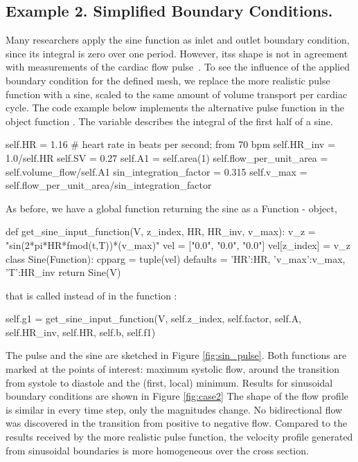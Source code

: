  

\subsection{Example 2. Simplified Boundary Conditions.} 

Many researchers apply the sine function as inlet and outlet boundary condition, since its integral is zero over one period. However, itss shape is not in agreement with measurements of the cardiac flow pulse~\cite{Loth2001}. To see the influence of the applied boundary condition for the defined mesh, we replace the more realistic pulse function with a sine, scaled to the same amount of volume transport per cardiac cycle. The code example below implements the alternative pulse function in the object function . The variable  describes the integral of the first half of a sine.
\begin{code}
self.HR = 1.16 # heart rate in beats per second; from 70 bpm
self.HR_inv = 1.0/self.HR
self.SV = 0.27 
self.A1 = self.area(1)
self.flow_per_unit_area = self.volume_flow/self.A1
sin_integration_factor = 0.315
self.v_max = self.flow_per_unit_area/sin_integration_factor	
\end{code}
As before, we have a global function returning the sine as a Function - object, 
\begin{code}
def get_sine_input_function(V, z_index, HR, HR_inv, v_max):
	v_z = "sin(2*pi*HR*fmod(t,T))*(v_max)"
	vel = ["0.0", "0.0", "0.0"]
	vel[z_index] = v_z
	class Sine(Function):
		cpparg = tuple(vel)
		defaults = {'HR':HR, 'v_max':v_max, 'T':HR_inv}		
	return Sine(V)
\end{code}
that is called instead of  in the function :
\begin{code}
self.g1 = get_sine_input_function(V, self.z_index, self.factor, self.A, self.HR_inv, self.HR, self.b, self.f1)
\end{code}



The pulse and the sine are sketched in Figure \ref{fig:sin_pulse}. Both functions are marked at the points of interest: maximum systolic flow, around the transition from systole to diastole and the (first, local) minimum. Results for sinusoidal boundary conditions are shown in Figure \ref{fig:case2} The shape of the flow profile is similar in every time step, only the magnitudes change. No bidirectional flow was discovered in the transition from positive to negative flow. Compared to the results received by the more realistic pulse function, the velocity profile generated from sinusoidal boundaries is more homogeneous over the cross section. 




